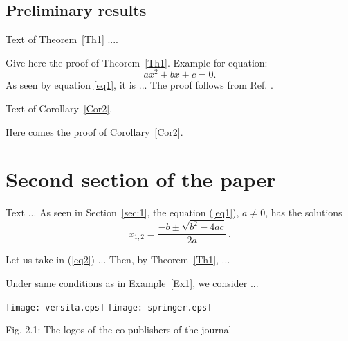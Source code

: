 \documentclass[twoside,reqno,11pt]{fcaa}
\begin{document}
   \vspace*{-12pt} %
 \subsection{Preliminary results}\label{subsec:1.1}

 \begin{theorem}\label{Th1}
Text of Theorem~\ref{Th1} ....
 \end{theorem}

 \proof %
 Give here the proof of Theorem~\ref{Th1}. Example for
equation:
\begin{equation}\label{eq1}
ax^2+bx +c =0.
\end{equation}
 As seen by equation \eqref{eq1}, it is ...
 The proof follows from Ref. \cite{Moak}.
 \proofend %

 \begin{corollary}\label{Cor2}
Text of Corollary~\ref{Cor2}.
 \end{corollary}

 \proof
 Here comes the proof of Corollary~\ref{Cor2}.
 \proofend

\section{Second section of the paper}\label{sec:2}

\setcounter{section}{2}
\setcounter{equation}{0}\setcounter{theorem}{0}


 Text ... As seen in Section~\ref{sec:1}, the equation
(\ref{eq1}), $ a\neq 0$, has the solutions
 \begin{equation}\label{eq2}
 x_{1,2}= {\frac {-b \pm \sqrt{b^2-4ac}}{2a}}\,.
 \end{equation}

 \begin{example}\label{Ex1}
 Let us take in (\ref{eq2}) ... Then, by Theorem~\ref{Th1}, ...
 \end{example}

 \begin{example}\label{Ex2}
 Under same conditions as in Example~\ref{Ex1}, we consider ...
 \end{example}

 \begin{center}
 \texttt{[image: versita.eps]}
 \hspace*{2cm}
 \texttt{[image: springer.eps]}

 \bigskip

Fig. 2.1: The logos of the co-publishers of the journal
 \end{center}
\end{document}

